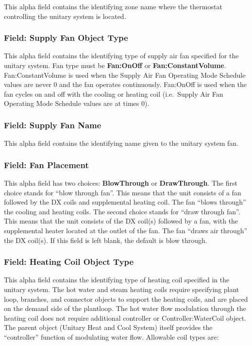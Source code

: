 This alpha field contains the identifying zone name where the thermostat controlling the unitary system is located.

\subsubsection{Field: Supply Fan Object Type}\label{field-supply-fan-object-type-2}

This alpha field contains the identifying type of supply air fan specified for the unitary system. Fan type must be \textbf{Fan:OnOff} or \textbf{Fan:ConstantVolume}. Fan:ConstantVolume is used when the Supply Air Fan Operating Mode Schedule values are never 0 and the fan operates continuously. Fan:OnOff is used when the fan cycles on and off with the cooling or heating coil (i.e.~Supply Air Fan Operating Mode Schedule values are at times 0).

\subsubsection{Field: Supply Fan Name}\label{field-supply-fan-name-2}

This alpha field contains the identifying name given to the unitary system fan.

\subsubsection{Field: Fan Placement}\label{field-fan-placement-2}

This alpha field has two choices: \textbf{BlowThrough} or \textbf{DrawThrough}. The first choice stands for ``blow through fan''. This means that the unit consists of a fan followed by the DX coils and supplemental heating coil. The fan ``blows through'' the cooling and heating coils. The second choice stands for ``draw through fan''. This means that the unit consists of the DX coil(s) followed by a fan, with the supplemental heater located at the outlet of the fan. The fan ``draws air through'' the DX coil(s). If this field is left blank, the default is blow through.

\subsubsection{Field: Heating Coil Object Type}\label{field-heating-coil-object-type-2}

This alpha field contains the identifying type of heating coil specified in the unitary system. The hot water and steam heating coils require specifying plant loop, branches, and connector objects to support the heating coils, and are placed on the demand side of the plantloop. The hot water flow modulation through the heating coil does not require additional controller or Controller:WaterCoil object. The parent object (Unitary Heat and Cool System) itself provides the ``controller'' function of modulating water flow. Allowable coil types are:

